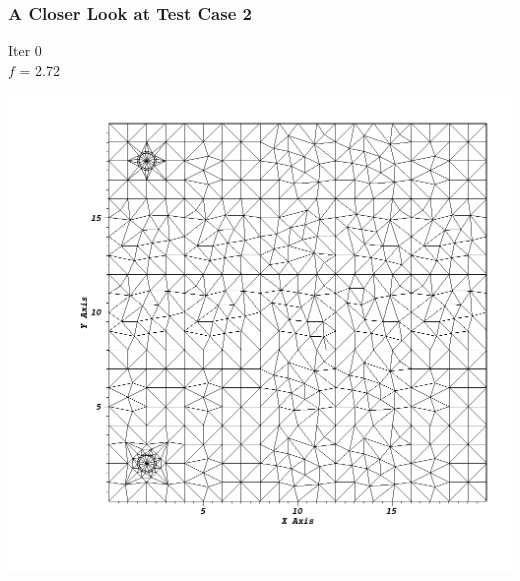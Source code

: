 \documentclass[compress]{beamer}
\begin{document}
\begin{frame}[t]\frametitle{A Closer Look at Test Case 2}
\begin{minipage}{0.15\textwidth}
\begin{footnotesize}
Iter 0 \\
$f$ = 2.72
\end{footnotesize}
\end{minipage}
\begin{minipage}{0.8\textwidth}
\centering
\includegraphics[scale=0.22]{figures/sameside_before.png}
\end{minipage}
\end{frame}
\end{document}
